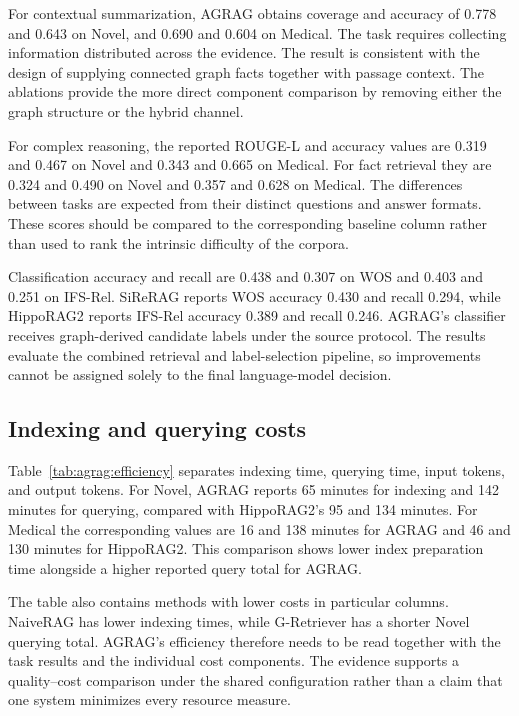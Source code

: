 For contextual summarization, AGRAG obtains coverage and accuracy of 0.778 and 0.643 on Novel, and 0.690 and 0.604 on Medical. The task requires collecting information distributed across the evidence. The result is consistent with the design of supplying connected graph facts together with passage context. The ablations provide the more direct component comparison by removing either the graph structure or the hybrid channel.

For complex reasoning, the reported ROUGE-L and accuracy values are 0.319 and 0.467 on Novel and 0.343 and 0.665 on Medical. For fact retrieval they are 0.324 and 0.490 on Novel and 0.357 and 0.628 on Medical. The differences between tasks are expected from their distinct questions and answer formats. These scores should be compared to the corresponding baseline column rather than used to rank the intrinsic difficulty of the corpora.

Classification accuracy and recall are 0.438 and 0.307 on WOS and 0.403 and 0.251 on IFS-Rel. SiReRAG reports WOS accuracy 0.430 and recall 0.294, while HippoRAG2 reports IFS-Rel accuracy 0.389 and recall 0.246. AGRAG's classifier receives graph-derived candidate labels under the source protocol. The results evaluate the combined retrieval and label-selection pipeline, so improvements cannot be assigned solely to the final language-model decision.

\subsection{Indexing and querying costs}

Table~\ref{tab:agrag:efficiency} separates indexing time, querying time, input tokens, and output tokens. For Novel, AGRAG reports 65 minutes for indexing and 142 minutes for querying, compared with HippoRAG2's 95 and 134 minutes. For Medical the corresponding values are 16 and 138 minutes for AGRAG and 46 and 130 minutes for HippoRAG2. This comparison shows lower index preparation time alongside a higher reported query total for AGRAG.

The table also contains methods with lower costs in particular columns. NaiveRAG has lower indexing times, while G-Retriever has a shorter Novel querying total. AGRAG's efficiency therefore needs to be read together with the task results and the individual cost components. The evidence supports a quality--cost comparison under the shared configuration rather than a claim that one system minimizes every resource measure.

